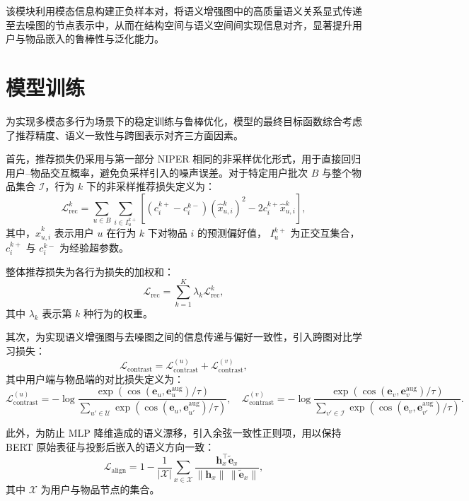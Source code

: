 该模块利用模态信息构建正负样本对，将语义增强图中的高质量语义关系显式传递至去噪图的节点表示中，从而在结构空间与语义空间间实现信息对齐，显著提升用户与物品嵌入的鲁棒性与泛化能力。


\section{模型训练}
为实现多模态多行为场景下的稳定训练与鲁棒优化，模型的最终目标函数综合考虑了推荐精度、语义一致性与跨图表示对齐三方面因素。

首先，推荐损失仍采用与第一部分 NIPER 相同的非采样优化形式，用于直接回归用户–物品交互概率，避免负采样引入的噪声误差。对于特定用户批次 $B$ 与整个物品集合 $\mathcal{I}$，行为 $k$ 下的非采样推荐损失定义为：
\begin{equation}
\mathcal{L}_{\mathrm{rec}}^{k}
= 
\sum_{u \in B} \sum_{i \in I_u^{k+}}
\left[
\left(c_i^{k+} - c_i^{k-}\right)
\left(\hat{x}_{u,i}^k\right)^2
-
2 c_i^{k+} \hat{x}_{u,i}^k
\right],
\end{equation}
其中，$\hat{x}_{u,i}^k$ 表示用户 $u$ 在行为 $k$ 下对物品 $i$ 的预测偏好值，
$ I_u^{k+} $ 为正交互集合，$ c_i^{k+} $ 与 $ c_i^{k-} $ 为经验超参数。

整体推荐损失为各行为损失的加权和：
\begin{equation}
\mathcal{L}_{\mathrm{rec}} = 
\sum_{k=1}^{K} \lambda_k \mathcal{L}_{\mathrm{rec}}^{k},
\end{equation}
其中 $\lambda_k$ 表示第 $k$ 种行为的权重。

其次，为实现语义增强图与去噪图之间的信息传递与偏好一致性，引入跨图对比学习损失：
\begin{equation}
\mathcal{L}_{\mathrm{contrast}} =
\mathcal{L}_{\mathrm{contrast}}^{(u)} +
\mathcal{L}_{\mathrm{contrast}}^{(v)},
\end{equation}
其中用户端与物品端的对比损失定义为：
\begin{equation}
\mathcal{L}_{\mathrm{contrast}}^{(u)} =
- \log
\frac{
\exp\!\left(
\cos(\mathbf{e}_u, \mathbf{e}_u^{\mathrm{aug}}) / \tau
\right)
}{
\sum\limits_{u' \in \mathcal{U}}
\exp\!\left(
\cos(\mathbf{e}_u, \mathbf{e}_{u'}^{\mathrm{aug}}) / \tau
\right)
},
\quad
\mathcal{L}_{\mathrm{contrast}}^{(v)} =
- \log
\frac{
\exp\!\left(
\cos(\mathbf{e}_v, \mathbf{e}_v^{\mathrm{aug}}) / \tau
\right)
}{
\sum\limits_{v' \in \mathcal{I}}
\exp\!\left(
\cos(\mathbf{e}_v, \mathbf{e}_{v'}^{\mathrm{aug}}) / \tau
\right)
}.
\end{equation}

此外，为防止 MLP 降维造成的语义漂移，引入余弦一致性正则项，用以保持 BERT 原始表征与投影后嵌入的语义方向一致：
\begin{equation}
\mathcal{L}_{\mathrm{align}} =
1 -
\frac{1}{|\mathcal{X}|}
\sum_{x \in \mathcal{X}}
\frac{
\mathbf{h}_x^\top \widetilde{\mathbf{e}}_x
}{
\|\mathbf{h}_x\| \, \|\widetilde{\mathbf{e}}_x\|
},
\end{equation}
其中 $\mathcal{X}$ 为用户与物品节点的集合。

